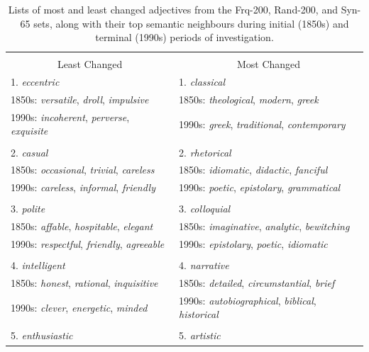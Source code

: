 \documentclass[output=paper]{langsci/langscibook}
\begin{document}
\begin{footnotesize}
\begin{longtable}{ll}
\caption{Lists of most and least changed adjectives from the {\sc Frq-200}, {\sc Rand-200}, and {\sc Syn-65} sets, along with their top semantic neighbours during initial (1850s) and terminal (1990s) periods of investigation.} \label{table:examples} \\\lsptoprule\endfirsthead\endhead\endfoot\lspbottomrule\endlastfoot
\multicolumn{2}{c}{{{\sc Frq-200}}} \\
\multicolumn{1}{c}{{Least Changed}} & \multicolumn{1}{c}{{Most Changed}} \\\midrule
1. {\it eccentric} & 1. {\it classical} \\
\qquad 1850s: {\it versatile}, {\it droll}, {\it impulsive} & \qquad 1850s: {\it theological}, {\it modern}, {\it greek} \\
\qquad 1990s: {\it incoherent}, {\it perverse}, {\it exquisite} & \qquad 1990s: {\it greek}, {\it traditional}, {\it contemporary} \\
& \\
2. {\it casual} & 2. {\it rhetorical} \\
\qquad 1850s: {\it occasional}, {\it trivial}, {\it careless} & \qquad 1850s: {\it idiomatic}, {\it didactic}, {\it fanciful} \\
\qquad 1990s: {\it careless}, {\it informal}, {\it friendly} & \qquad 1990s: {\it poetic}, {\it epistolary}, {\it grammatical} \\
& \\
3. {\it polite} & 3. {\it colloquial} \\
\qquad 1850s: {\it affable}, {\it hospitable}, {\it elegant} & \qquad 1850s: {\it imaginative}, {\it analytic}, {\it bewitching} \\
\qquad 1990s: {\it respectful}, {\it friendly}, {\it agreeable} & \qquad 1990s: {\it epistolary}, {\it poetic}, {\it idiomatic} \\
& \\
4. {\it intelligent} & 4. {\it narrative} \\
\qquad 1850s: {\it honest}, {\it rational}, {\it inquisitive} & \qquad 1850s: {\it detailed}, {\it circumstantial}, {\it brief} \\
\qquad 1990s: {\it clever}, {\it energetic}, {\it minded} & \qquad 1990s: {\it autobiographical}, {\it biblical}, {\it historical} \\
& \\
5. {\it enthusiastic} & 5. {\it artistic} \\

\end{longtable}
\end{footnotesize}
\end{document}
